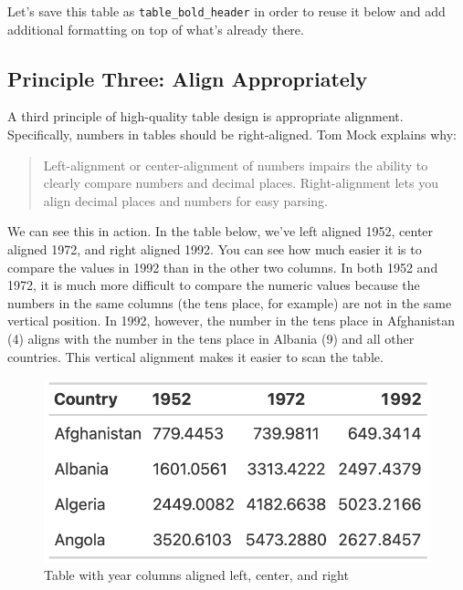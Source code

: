 \documentclass[
]{book}
\begin{document}
Let's save this table as \texttt{table\_bold\_header} in order to reuse it below and add additional formatting on top of what's already there.

\hypertarget{principle-three-align-appropriately}{%
\subsection*{Principle Three: Align Appropriately}\label{principle-three-align-appropriately}}

A third principle of high-quality table design is appropriate alignment. Specifically, numbers in tables should be right-aligned. Tom Mock explains why:

\begin{quote}
Left-alignment or center-alignment of numbers impairs the ability to clearly compare numbers and decimal places. Right-alignment lets you align decimal places and numbers for easy parsing.
\end{quote}

We can see this in action. In the table below, we've left aligned 1952, center aligned 1972, and right aligned 1992. You can see how much easier it is to compare the values in 1992 than in the other two columns. In both 1952 and 1972, it is much more difficult to compare the numeric values because the numbers in the same columns (the tens place, for example) are not in the same vertical position. In 1992, however, the number in the tens place in Afghanistan (4) aligns with the number in the tens place in Albania (9) and all other countries. This vertical alignment makes it easier to scan the table.

\begin{figure}
\includegraphics[width=1\linewidth]{nostarch/temp/F05006} \caption{Table with year columns aligned left, center, and right}\label{fig:unnamed-chunk-20}
\end{figure}
\end{document}
